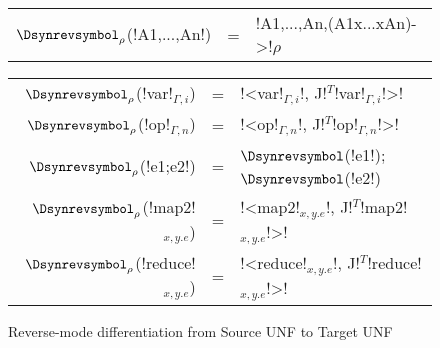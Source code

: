 \begin{figure*}[t]
    \begin{tabular}{r c l}
        $\Dsynrevsymbol_{\rho}$(!A1,...,An!) &=& !A1,...,An,(A1x...xAn)->!$\rho$
    \end{tabular}
    
    \medskip
    \begin{tabular}{r c l}
    $\Dsynrevsymbol_{\rho}$(!var!$_{\Gamma,i}$) &=& !<var!$_{\Gamma,i}$!, J!$^T$!var!$_{\Gamma,i}$!>! \\
    $\Dsynrevsymbol_{\rho}$(!op!$_{\Gamma,n}$) &=& !<op!$_{\Gamma,n}$!, J!$^T$!op!$_{\Gamma,n}$!>! \\ 
    $\Dsynrevsymbol_{\rho}$(!e1;e2!) &=& $\Dsynrevsymbol$(!e1!); $\Dsynrevsymbol$(!e2!)\\ 
    $\Dsynrevsymbol_{\rho}$(!map2!$_{x,y.e}$) &=& !<map2!$_{x,y.e}$!, J!$^T$!map2!$_{x,y.e}$!>! \\ 
    $\Dsynrevsymbol_{\rho}$(!reduce!$_{x,y.e}$) &=& !<reduce!$_{x,y.e}$!, J!$^T$!reduce!$_{x,y.e}$!>! \\  
    \end{tabular}
    \caption{Reverse-mode differentiation from Source UNF to Target UNF}
    \label{fig:diff_macro}    
\end{figure*}